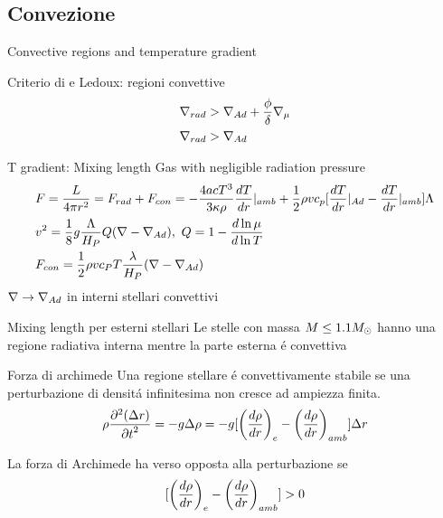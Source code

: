 \subsection{Convezione}

\begin{frame}{Convective regions and temperature gradient}
\begin{block}{Criterio di \sch e Ledoux: regioni convettive}
\begin{align*}
&\nrad{}>\nad+\frac{\phi}{\delta}\nmu{}\\
&\nrad{}>\nad
\end{align*}
\end{block}
\begin{block}{T gradient: Mixing length}
Gas with negligible radiation pressure
\begin{align*}
&F=\frac{L}{4\pi r^2}=F_{rad}+F_{con}=-\frac{4acT^3}{3\kappa\rho}\TDy{r}{T}|_{amb}+\frac{1}{2}\rho vc_p[\TDy{r}{T}|_{Ad}-\TDy{r}{T}|_{amb}]\Lambda\\
&v^2=\frac{1}{8}g\frac{\Lambda}{H_P}Q(\nabla-\nad),\ Q=1-\TDly{T}{\mu}\\
&F_{con}=\frac{1}{2}\rho vc_PT\frac{\lambda}{H_P}(\nabla-\nad{})
\end{align*}
$\nabla\to\nad{}$ in interni stellari convettivi
\end{block}
\end{frame}

\begin{frame}{Mixing length per esterni stellari}
Le stelle con massa $M\leq1.1\msun{}$ hanno una regione radiativa interna mentre la parte esterna \'e convettiva
\end{frame}

\begin{wordonframe}{Forza di archimede}
Una regione stellare \'e convettivamente stabile se una perturbazione di densit\'a infinitesima non cresce ad ampiezza finita.
\begin{equation*}\label{eq:buoyancyEOM}
\rho\PtwoDy{t}{(\Delta r)}=-g\Delta\rho=-g[\Dcvar{\TDy{r}{\rho}}{e}-\Dcvar{\TDy{r}{\rho}}{amb}]\Delta r
\end{equation*}

La forza di Archimede ha verso opposta alla perturbazione se
\begin{equation*}\label{eq:Acriterion}
[\Dcvar{\TDy{r}{\rho}}{e}-\Dcvar{\TDy{r}{\rho}}{amb}]>0
\end{equation*}
\end{wordonframe}

